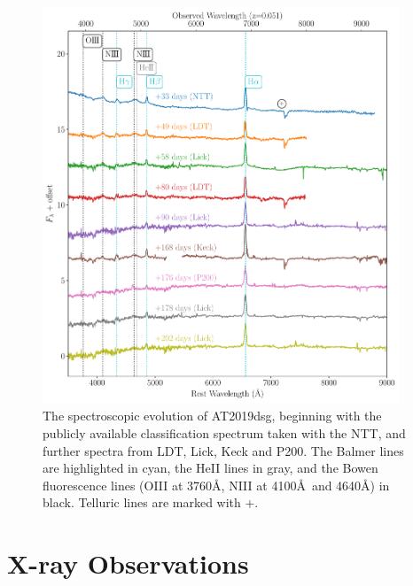 \documentclass{nature_plusfigure}
\begin{document}
\begin{methods}
\begin{figure}
    \centering
    \includegraphics[width=0.95\textwidth]{figures/spectra.pdf}
    \caption{The spectroscopic evolution of AT2019dsg, beginning with the publicly available classification spectrum taken with the NTT\cite{2019ATel12752....1N}, and further spectra from LDT, Lick, Keck and P200. The Balmer lines are highlighted in cyan, the HeII lines in gray, and the Bowen fluorescence lines (OIII at 3760\AA, NIII at 4100\AA ~and 4640\AA) in black. Telluric lines are marked with +.}
    \label{fig:spectrum}
\end{figure}

\section{X-ray Observations}


\end{methods}
\end{document}
